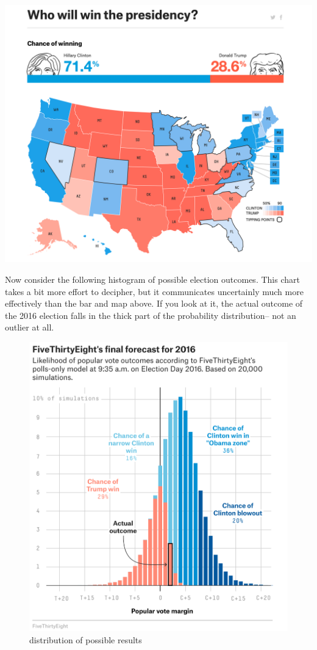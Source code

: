 \documentclass[
]{book}
\begin{document}
\includegraphics{images/map.png}

Now consider the following histogram of possible election outcomes. This chart takes a bit more effort to decipher, but it communicates uncertainly much more effectively than the bar and map above. If you look at it, the actual outcome of the 2016 election falls in the thick part of the probability distribution-- not an outlier at all.

\begin{figure}
\centering
\includegraphics{images/uncertain_dist.png}
\caption{distribution of possible results}
\end{figure}
\end{document}
